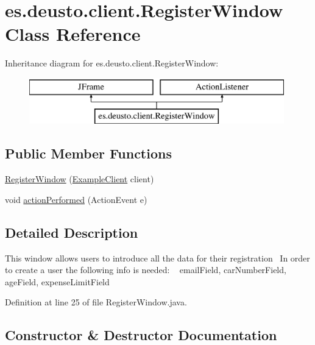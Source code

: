 \hypertarget{classes_1_1deusto_1_1client_1_1_register_window}{}\section{es.\+deusto.\+client.\+Register\+Window Class Reference}
\label{classes_1_1deusto_1_1client_1_1_register_window}
Inheritance diagram for es.\+deusto.\+client.\+Register\+Window\+:\begin{figure}[H]
\begin{center}
\leavevmode
\includegraphics[height=2.000000cm]{classes_1_1deusto_1_1client_1_1_register_window}
\end{center}
\end{figure}
\subsection*{Public Member Functions}
\begin{DoxyCompactItemize}
\item 
\hyperlink{classes_1_1deusto_1_1client_1_1_register_window_a366a6694a28782dd4af61379aff22b4e}{Register\+Window} (\hyperlink{classes_1_1deusto_1_1client_1_1_example_client}{Example\+Client} client)
\item 
void \hyperlink{classes_1_1deusto_1_1client_1_1_register_window_a0af8c49b9021ebd19adf9998dc121f58}{action\+Performed} (Action\+Event e)
\end{DoxyCompactItemize}


\subsection{Detailed Description}
This window allows users to introduce all the data for their registration~\newline
In order to create a user the following info is needed\+: ~\newline
email\+Field, car\+Number\+Field, age\+Field, expense\+Limit\+Field 

Definition at line 25 of file Register\+Window.\+java.



\subsection{Constructor \& Destructor Documentation}
\mbox{\label{classes_1_1deusto_1_1client_1_1_register_window_a366a6694a28782dd4af61379aff22b4e}} 
